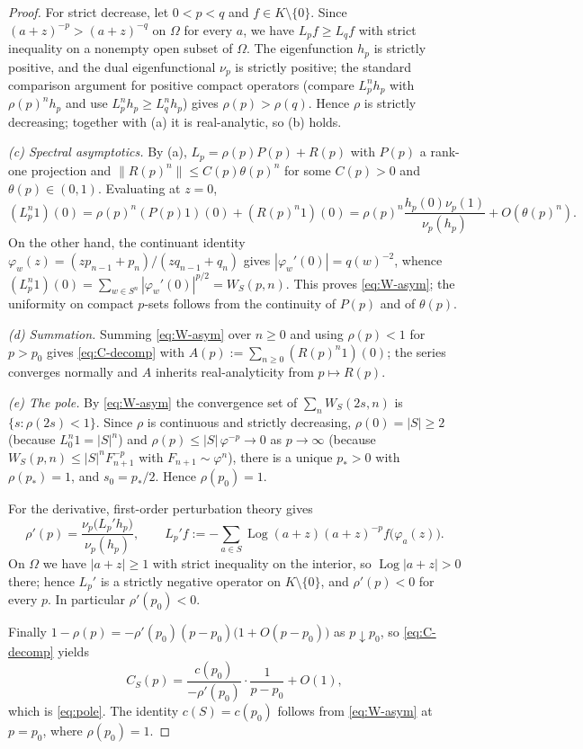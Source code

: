 \begin{proof}
For strict decrease, let $0<p<q$ and $f\in K\setminus\{0\}$. Since
$(a+z)^{-p}>(a+z)^{-q}$ on $\Omega$ for every $a$, we have $L_pf\ge L_qf$ with
strict inequality on a nonempty open subset of $\Omega$. The eigenfunction
$h_p$ is strictly positive, and the dual eigenfunctional $\nu_p$ is strictly
positive; the standard comparison argument for positive compact operators
(compare $L_p^nh_p$ with $\rho(p)^nh_p$ and use $L_p^nh_p\ge L_q^nh_p$) gives
$\rho(p)>\rho(q)$. Hence $\rho$ is strictly decreasing; together with (a) it is
real-analytic, so (b) holds.

\emph{(c) Spectral asymptotics.}
By (a), $L_p=\rho(p)P(p)+R(p)$ with $P(p)$ a rank-one projection and
$\|R(p)^n\|\le C(p)\theta(p)^n$ for some $C(p)>0$ and $\theta(p)\in(0,1)$.
Evaluating at $z=0$,
\[
(L_p^n1)(0)=\rho(p)^n(P(p)1)(0)+(R(p)^n1)(0)
=\rho(p)^n\frac{h_p(0)\nu_p(1)}{\nu_p(h_p)}+O(\theta(p)^n).
\]
On the other hand, the continuant identity
$\varphi_w(z)=(zp_{n-1}+p_n)/(zq_{n-1}+q_n)$ gives
$|\varphi_w'(0)|=q(w)^{-2}$, whence
$(L_p^n1)(0)=\sum_{w\in S^n}|\varphi_w'(0)|^{p/2}=W_S(p,n)$. This proves
\eqref{eq:W-asym}; the uniformity on compact $p$-sets follows from the
continuity of $P(p)$ and of $\theta(p)$.

\emph{(d) Summation.}
Summing \eqref{eq:W-asym} over $n\ge0$ and using $\rho(p)<1$ for $p>p_0$ gives
\eqref{eq:C-decomp} with $A(p):=\sum_{n\ge0}(R(p)^n1)(0)$; the series converges
normally and $A$ inherits real-analyticity from $p\mapsto R(p)$.

\emph{(e) The pole.}
By \eqref{eq:W-asym} the convergence set of $\sum_nW_S(2s,n)$ is
$\{s:\rho(2s)<1\}$. Since $\rho$ is continuous and strictly decreasing,
$\rho(0)=|S|\ge2$ (because $L_0^n1=|S|^n$) and
$\rho(p)\le |S|\,\varphi^{-p}\to0$ as $p\to\infty$ (because
$W_S(p,n)\le |S|^nF_{n+1}^{-p}$ with $F_{n+1}\sim\varphi^n$), there is a unique
$p_*>0$ with $\rho(p_*)=1$, and $s_0=p_*/2$. Hence $\rho(p_0)=1$.

For the derivative, first-order perturbation theory gives
\[
\rho'(p)=\frac{\nu_p\bigl(L_p'h_p\bigr)}{\nu_p(h_p)},\qquad
L_p'f:=-\sum_{a\in S}\operatorname{Log}(a+z)(a+z)^{-p}f\bigl(\varphi_a(z)\bigr).
\]
On $\Omega$ we have $|a+z|\ge1$ with strict inequality on the interior, so
$\operatorname{Log}|a+z|>0$ there; hence $L_p'$ is a strictly negative operator on
$K\setminus\{0\}$, and $\rho'(p)<0$ for every $p$. In particular
$\rho'(p_0)<0$.

Finally $1-\rho(p)=-\rho'(p_0)(p-p_0)\bigl(1+O(p-p_0)\bigr)$ as $p\downarrow p_0$,
so \eqref{eq:C-decomp} yields
\[
C_S(p)=\frac{c(p_0)}{-\rho'(p_0)}\cdot\frac{1}{p-p_0}+O(1),
\]
which is \eqref{eq:pole}. The identity $c(S)=c(p_0)$ follows from
\eqref{eq:W-asym} at $p=p_0$, where $\rho(p_0)=1$.
\end{proof}

